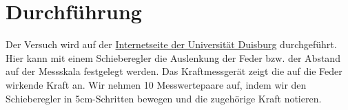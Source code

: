 \section{Durchführung}
\label{sec:Durchführung}
Der Versuch wird auf der \href{http://kallisto.didaktik.physik.uni-due.de/IBEs/Freierfall.php}{Internetseite der Universität Duisburg} durchgeführt. Hier kann mit einem Schieberegler die Auslenkung der Feder bzw. der Abstand auf der Messskala festgelegt werden. Das Kraftmessgerät zeigt die auf die Feder wirkende Kraft an. Wir nehmen 10 Messwertepaare auf, indem wir den Schieberegler in 5cm-Schritten bewegen und die zugehörige Kraft notieren.

